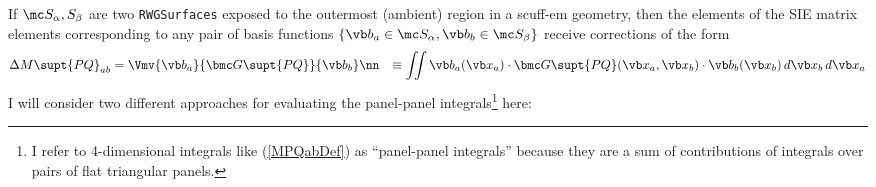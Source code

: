 \documentclass[letterpaper]{article}
\begin{document}
If $\mc S_\alpha, S_\beta$ are two \texttt{RWGSurfaces} 
exposed to the outermost (ambient) region in a {\sc scuff-em}
geometry, then the elements of the SIE matrix elements corresponding
to any pair of basis functions
$\{\vb b_a\in \mc S_\alpha, \vb b_b\in \mc S_\beta\}$ receive
corrections of the form
\begin{align}
   \Delta M\supt{PQ}_{ab}
 &=\Vmv{\vb b_a}{\bmc G\supt{PQ}}{\vb b_b}
\nn
&\equiv \iint
    \vb    b_a(\vb x_a)
    \cdot \bmc G\supt{PQ}(\vb x_a, \vb x_b)
    \cdot \vb b_b(\vb x_b)
    \,d\vb x_b 
    \,d\vb x_a 
\label{MPQabDef}
\end{align}
I will consider two different approaches for evaluating the
panel-panel integrals\footnote{I refer to 4-dimensional
integrals like (\ref{MPQabDef}) as ``panel-panel integrals'' because
they are a sum of contributions of integrals over pairs of flat
triangular panels.} here:
\end{document}
